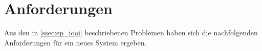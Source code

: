 \section{Anforderungen}
\label{sec:e_anforderungen}

Aus den in \cref{ssec:ep_iooi} beschriebenen
Problemen haben sich die nachfolgenden Anforderungen für ein neues System
ergeben.




